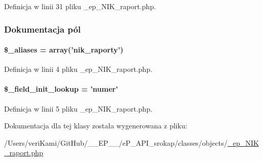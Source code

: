 Definicja w linii 31 pliku \-\_\-ep\-\_\-\-N\-I\-K\-\_\-raport.\-php.



\subsubsection{Dokumentacja pól}
\hypertarget{classep___n_i_k___raport_ab4e31d75f0bc5d512456911e5d01366b}{
\paragraph[{\$\-\_\-aliases}]{\setlength{\rightskip}{0pt plus 5cm}\$\-\_\-aliases = array('nik\-\_\-raporty')}}\label{classep___n_i_k___raport_ab4e31d75f0bc5d512456911e5d01366b}


Definicja w linii 4 pliku \-\_\-ep\-\_\-\-N\-I\-K\-\_\-raport.\-php.

\hypertarget{classep___n_i_k___raport_a4a4d54ae35428077a7c61ec8a5139af3}{
\paragraph[{\$\-\_\-field\-\_\-init\-\_\-lookup}]{\setlength{\rightskip}{0pt plus 5cm}\$\-\_\-field\-\_\-init\-\_\-lookup = 'numer'}}\label{classep___n_i_k___raport_a4a4d54ae35428077a7c61ec8a5139af3}


Definicja w linii 5 pliku \-\_\-ep\-\_\-\-N\-I\-K\-\_\-raport.\-php.



Dokumentacja dla tej klasy została wygenerowana z pliku\-:\begin{DoxyCompactItemize}
\item 
/\-Users/veri\-Kami/\-Git\-Hub/\-\_\-\-\_\-\-E\-P\-\_\-\-\_\-/e\-P\-\_\-\-A\-P\-I\-\_\-srokap/classes/objects/\hyperlink{__ep___n_i_k__raport_8php}{\-\_\-ep\-\_\-\-N\-I\-K\-\_\-raport.\-php}\end{DoxyCompactItemize}
